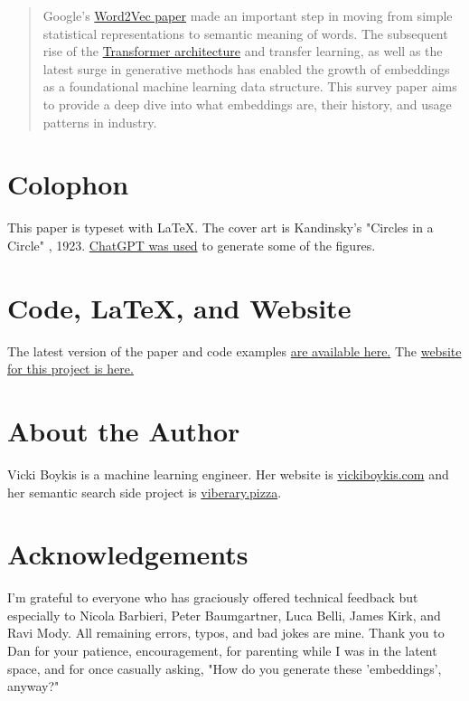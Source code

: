 \documentclass[11pt, table]{diazessay} %
\begin{document}
\begin{sloppypar}
\begin{abstract}
Google's \href{https://arxiv.org/abs/1301.3781}{Word2Vec paper} made an important step in moving from simple statistical representations to semantic meaning of words. The subsequent rise of the \href{https://arxiv.org/abs/1706.03762}{Transformer architecture} and transfer learning, as well as the latest surge in generative methods has enabled the growth of embeddings as a foundational machine learning data structure. This survey paper aims to provide a deep dive into what embeddings are, their history, and usage patterns in industry.

\end{abstract}

\section*{Colophon }
This paper is typeset with \LaTeX. The cover art is Kandinsky's "Circles in a Circle" , 1923. \href{https://vickiboykis.com/2023/02/26/what-should-you-use-chatgpt-for/}{ChatGPT was used} to generate some of the figures.

\section*{Code, \LaTeX, and Website}
The latest version of the paper and code examples \href{https://github.com/veekaybee/what_are_embeddings}{are available here.} The   \href{http://vickiboykis.com/what_are_embeddings/}{website for this project is here.}

\section*{About the Author}
Vicki Boykis is a machine learning engineer. Her website is \href{https://www.vickiboykis.com}{vickiboykis.com} and her semantic search side project is \href{https://viberary.pizza}{viberary.pizza}. 


\section*{Acknowledgements}
I'm grateful to everyone who has graciously offered technical feedback but especially to Nicola Barbieri, Peter Baumgartner, Luca Belli, James Kirk, and Ravi Mody. All remaining errors, typos, and bad jokes are mine. Thank you to Dan for your patience, encouragement, for parenting while I was in the latent space, and for once casually asking, "How do you generate these 'embeddings', anyway?"


\end{sloppypar}
\end{document}
